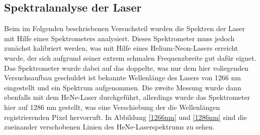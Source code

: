 \subsection{Spektralanalyse der Laser}
Beim im Folgenden beschriebenen Versuchsteil wurden die Spektren der Laser mit Hilfe eines Spektrometers analysiert. Dieses Spektrometer muss jedoch zunächst kalibriert werden, was mit Hilfe eines Helium-Neon-Lasers erreicht wurde, der sich aufgrund seiner extrem schmalen Frequenzbreite gut dafür eignet. \newline
Das Spektrometer wurde dabei auf das doppelte, was nur dem hier voliegenden Versuchsaufbau geschuldet ist bekannte Wellenlänge des Lasers von 1266 nm eingestellt und ein Spektrum aufgenommen. Die zweite Messung wurde dann ebenfalls mit dem HeNe-Laser durchgeführt, allerdings wurde das Spektrometer hier auf 1286 nm gestellt, was eine Verschiebung der die Wellenlängen registrierenden Pixel hervorruft. In Abbildung \ref{1266nm} und \ref{1286nm} sind die zueinander verschobenen Linien des HeNe-Laserspektrums zu sehen.
\begin{figure}[H]
	\begin{center}
		\label{kalib}
	\end{center}
\end{figure}
